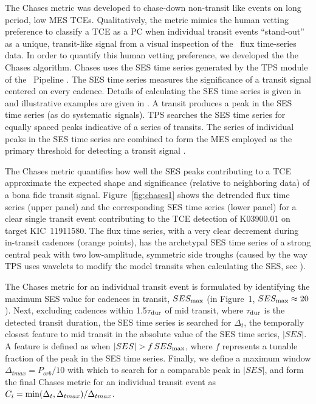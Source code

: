 The Chases metric was developed to chase-down non-transit like events on long period, low MES TCEs. Qualitatively, the metric mimics the human vetting preference to classify a TCE as a PC when individual transit events ``stand-out'' as a unique, transit-like signal from a visual inspection of the \kepler\ flux time-series data.  In order to quantify this human vetting preference, we developed the the Chases algorithm. Chases uses the SES time series generated by the TPS module of the \kepler\ Pipeline \citep{JenkinsKDPH}.  The SES time series measures the significance of a transit signal centered on every cadence.  Details of calculating the SES time series is given in \citet{Jenkins2002a} and illustrative examples are given in \citet{Tenenbaum2012}. A transit produces a peak in the SES time series (as do systematic signals). TPS searches the SES time series for equally spaced peaks indicative of a series of transits. The series of individual peaks in the SES time series are combined to form the MES employed as the primary threshold for detecting a transit signal \citep{Jenkins2002a,Twicken2016,JenkinsKDPH}.  


The Chases metric quantifies how well the SES peaks contributing to a TCE approximate the expected shape and significance (relative to neighboring data) of a bona fide transit signal.  Figure~\ref{fig:chases1} shows the detrended flux time series (upper panel) and the corresponding SES time series (lower panel) for a clear single transit event contributing to the TCE detection of K03900.01 on target KIC~11911580.  The flux time series, with a very clear decrement during in-transit cadences (orange points), has the archetypal SES time series of a strong central peak with two low-amplitude, symmetric side troughs (caused by the way TPS uses wavelets to modify the model transits when calculating the SES, see \citealt{JenkinsKDPH}). 

The Chases metric for an individual transit event is formulated by identifying the maximum SES value for cadences in transit, $SES_{\rm max}$ (in Figure~1, $SES_{\rm max}\approx20$).  Next, excluding cadences within 1.5$\tau_{\rm dur}$ of mid transit, where $\tau_{\rm dur}$ is the detected transit duration, the SES time series is searched for $\Delta_{t}$, the temporally closest feature to mid transit in the absolute value of the SES time series, $\lvert SES \rvert$. A feature is defined as when  $\lvert SES \rvert>f\, SES_{\rm max}$, where $f$ represents a tunable fraction of the peak in the SES time series.  Finally, we define a maximum window $\Delta_{tmax}=P_{orb}/10$ with which to search for a comparable peak in $\lvert SES \rvert$, and form the final Chases metric for an individual transit event as $C_{i} = {\rm min}(\Delta_{t},\Delta_{tmax})/\Delta_{tmax}$.  

